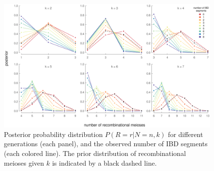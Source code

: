 \documentclass[11pt]{article}
\begin{document}
\begin{figure}[!ht]

  \includegraphics[width=\textwidth]{images/rm-posterior}

  \caption{Posterior probability distribution $P(R = r | N = n, k)$ for
different generations (each panel), and the observed number of IBD segments
(each colored line). The prior distribution of recombinational meioses given
$k$ is indicated by a black dashed line.}

  \label{fig:inference}

\end{figure}
\end{document}

